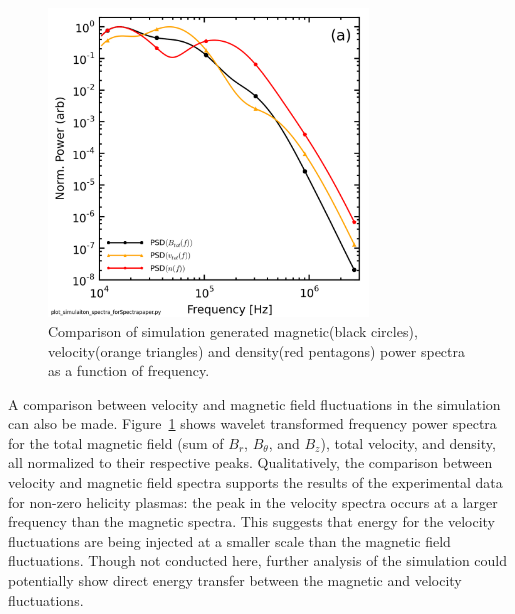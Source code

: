 \documentclass[aip,prl,amsmath,amssymb,reprint,superscriptaddress]{revtex4-1} %
\begin{document}
\begin{figure}[!htbp]
\centerline{
\includegraphics[width=8.5cm]{BfieldFlow_simulation_comparison}}
\caption{\label{fig:bflow_comp} Comparison of simulation generated magnetic(black circles), velocity(orange triangles) and density(red pentagons) power spectra as a function of frequency.}
\end{figure}

A comparison between velocity and magnetic field fluctuations in the simulation can also be made. Figure~\ref{fig:bflow_comp} shows wavelet transformed frequency power spectra for the total magnetic field (sum of $B_{r}$, $B_{\theta}$, and $B_{z}$), total velocity, and density, all normalized to their respective peaks. Qualitatively, the comparison between velocity and magnetic field spectra supports the results of the experimental data for non-zero helicity plasmas: the peak in the velocity spectra occurs at a larger frequency than the magnetic spectra. This suggests that energy for the velocity fluctuations are being injected at a smaller scale than the magnetic field fluctuations. Though not conducted here, further analysis of the simulation could potentially show direct energy transfer between the magnetic and velocity fluctuations.
\end{document}
